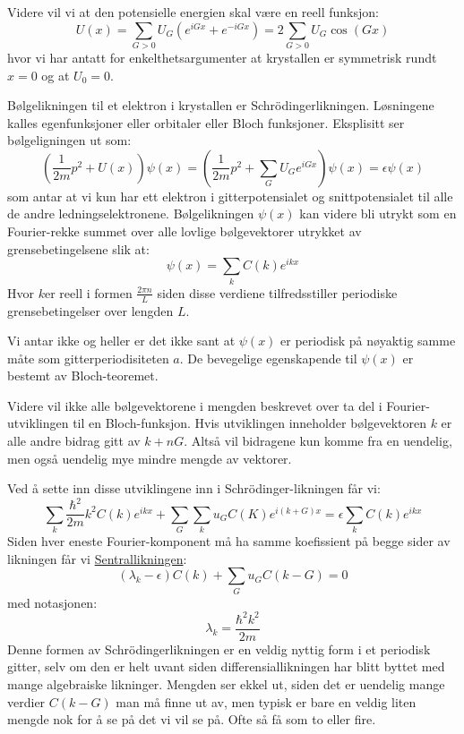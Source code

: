 \documentclass{article}
\begin{document}
Videre vil vi at den potensielle energien skal være en reell funksjon:
\begin{equation}
    U(x) = \sum_{G>0} U_G \left(e^{iGx} + e^{-iGx}\right) = 2 \sum_{G>0} U_G \cos (Gx)
\end{equation}
hvor vi har antatt for enkelthetsargumenter at krystallen er symmetrisk rundt $x= 0$ og at $U_0 = 0$.

Bølgelikningen til et elektron i krystallen er Schrödingerlikningen. Løsningene kalles egenfunksjoner eller orbitaler eller Bloch funksjoner. Eksplisitt ser bølgeligningen ut som:
\begin{equation}
    \left(\frac{1}{2m}p^2 + U(x)\right)\psi(x) = \left(\frac{1}{2m}p^2 + \sum_G U_G e^{iGx}\right) \psi(x) = \epsilon \psi(x)
\end{equation}
som antar at vi kun har ett elektron i gitterpotensialet og snittpotensialet til alle de andre ledningselektronene. Bølgelikningen $\psi(x)$ kan videre bli utrykt som en Fourier-rekke summet over alle lovlige bølgevektorer utrykket av grensebetingelsene slik at:
\begin{equation}
    \psi(x) = \sum_k C(k) e^{ikx}
\end{equation}
Hvor $k$er reell i formen $\frac{2\pi n}{L}$ siden disse verdiene tilfredsstiller periodiske grensebetingelser over lengden $L$.

Vi antar ikke og heller er det ikke sant at $\psi(x)$ er periodisk på nøyaktig samme måte som gitterperiodisiteten $a$. De bevegelige egenskapende til $\psi(x)$ er bestemt av Bloch-teoremet.

Videre vil ikke alle bølgevektorene i mengden beskrevet over ta del i Fourier-utviklingen til en Bloch-funksjon. Hvis utviklingen inneholder bølgevektoren $k$ er alle andre bidrag gitt av $k + nG$. Altså vil bidragene  kun komme fra en uendelig, men også uendelig mye mindre mengde av vektorer.

Ved å sette inn disse utviklingene inn i Schrödinger-likningen får vi:
\begin{equation}
    \sum_k \frac{\hbar^2}{2m} k^2 C(k) e^{ikx} + \sum_G \sum_k u_G C(K) e^{i(k+G)x} = \epsilon \sum_k C(k) e^{ikx}
\end{equation}
Siden hver eneste Fourier-komponent må ha samme koefissient på begge sider av likningen får vi \underline{Sentrallikningen}:
\begin{equation}
\label{eq:sentrallikningen}
    \boxed{(\lambda_k - \epsilon)C(k) + \sum_G u_G C(k-G) = 0}
\end{equation}
med notasjonen:
\begin{equation}
    \lambda_k = \frac{\hbar^2 k^2}{2m}
\end{equation}
Denne formen av Schrödingerlikningen er en veldig nyttig form i et periodisk gitter, selv om den er helt uvant siden differensiallikningen har blitt byttet med mange algebraiske likninger. Mengden ser ekkel ut, siden det er uendelig mange verdier $C(k-G)$ man må finne ut av, men typisk er bare en veldig liten mengde nok for å se på det vi vil se på. Ofte så få som to eller fire.
\end{document}
